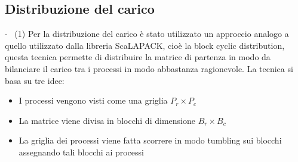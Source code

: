 \documentclass[compress]{beamer}
\begin{document}
\subsection{Distribuzione del carico}
\begin{frame}{\secname \text{ }- \subsecname\ (1)}
    Per la distribuzione del carico è stato utilizzato un approccio analogo a quello utilizzato dalla libreria ScaLAPACK, cioè la block cyclic distribution, questa tecnica permette di distribuire la matrice di partenza in modo da bilanciare il carico tra i processi in modo abbastanza ragionevole. La tecnica si basa su tre idee:
    \vspace{0.3cm}
    \begin{itemize}
        \item I processi vengono visti come una griglia $P_r \times P_c$
        \item La matrice viene divisa in blocchi di dimensione $B_r \times B_c$
        \item La griglia dei processi viene fatta scorrere in modo tumbling sui blocchi assegnando tali blocchi ai processi
    \end{itemize}
\end{frame}
\end{document}
